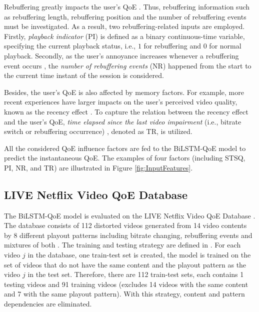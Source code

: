 Rebuffering greatly impacts the user's QoE \cite{StallingEvents}.
Thus, rebuffering information such as rebuffering length, rebuffering position and the number of rebuffering events must be investigated.
As a result, two rebuffering-related inputs are employed.
Firstly, \textit{playback indicator} (PI) \cite{QoEModel_NARX_DynamicNetworks, QoEModel_NLSS, QoEModel_LSTM} is defined as a binary continuous-time variable, specifying the current playback status, i.e., $1$ for rebuffering and $0$ for normal playback.
Secondly, as the user's annoyance increases whenever a rebuffering event occurs \cite{StallingEvents}, the \textit{number of rebuffering events} (NR) happened from the start to the current time instant of the session is considered.

Besides, the user's QoE is also affected by memory factors.
For example, more recent experiences have larger impacts on the user's perceived video quality, known as the recency effect \cite{Recency, NetflixQoE, LFOVIA}.
To capture the relation between the recency effect and the user's QoE, \textit{time elapsed since the last video impairment} (i.e., bitrate switch or rebuffering occurrence) \cite{QoEModel_NARX_DynamicNetworks, QoEModel_NLSS, QoEModel_LSTM}, denoted as TR, is utilized.


All the considered QoE influence factors are fed to the BiLSTM-QoE model to predict the instantaneous QoE. The examples of four factors (including STSQ, PI, NR, and TR) are illustrated in Figure \ref{fig:InputFeatures}.




\subsection{LIVE Netflix Video QoE Database}


The BiLSTM-QoE model is evaluated on the LIVE Netflix Video QoE Database \citep{NetflixQoE}.
The database consists of 112 distorted videos generated from 14 video contents by 8 different playout patterns
including bitrate changing, rebuffering events and mixtures of both \citep{NetflixQoE}.
The training and testing strategy are defined in \citep{QoEModel_LSTM}.
For each video $j$ in the database, one train-test set is created,
the model is trained on the set of videos that do not have the same content
and the playout pattern as the video $j$ in the test set.
Therefore, there are 112 train-test sets, each contains 1 testing videos and 91 training videos
(excludes 14 videos with the same content and 7 with the same playout pattern).
With this strategy, content and pattern dependencies are eliminated.





